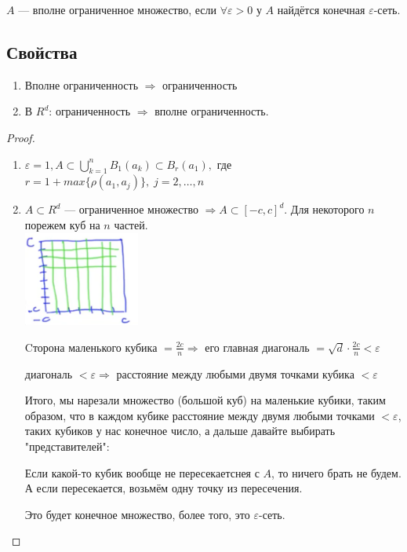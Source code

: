 \begin{conj}
    $A$ --- вполне ограниченное множество, если $\forall \varepsilon > 0$ у $A$ найдётся конечная $\varepsilon$-сеть.
\end{conj}

\subsection*{Свойства} 

\begin{enumerate}
    \item Вполне ограниченность $\Longrightarrow$ ограниченность
    \item В $R^d$: ограниченность $\Longrightarrow$ вполне ограниченность.
\end{enumerate}

\begin{proof}
    $ \quad $ \\
    \begin{enumerate}
        \item $\varepsilon = 1, A \subset \bigcup\limits_{k=1}^{n} B_1(a_k) \subset B_r(a_1),$ где $r = 1 + max \{ \rho(a_1, a_j) \}, \; j = 2, \dots, n$
        \item $A \subset R^d$ --- ограниченное множество $\Longrightarrow A \subset [-c, c]^d$. Для некоторого $n$ порежем куб на $n$ частей. \\

        \includegraphics[width=1.5in]{./images/T46_pic.png} %

        Cторона маленького кубика $= \frac{2c}{n} \Longrightarrow$ его главная диагональ $= \sqrt{d} \cdot \frac{2c}{n} < \varepsilon$

        диагональ $< \varepsilon \Longrightarrow$ расстояние между любыми двумя точками кубика $< \varepsilon$

        Итого, мы нарезали множество (большой куб) на маленькие кубики, таким образом, что в каждом кубике расстояние между двумя любыми точками $< \varepsilon$,
        таких кубиков у нас конечное число, а дальше давайте выбирать "представителей":

        Если какой-то кубик вообще не пересекаетснея с $A$, то ничего брать не будем. А если пересекается, возьмём одну точку из пересечения.

        Это будет конечное множество, более того, это $\varepsilon$-сеть.
    \end{enumerate}
\end{proof}


